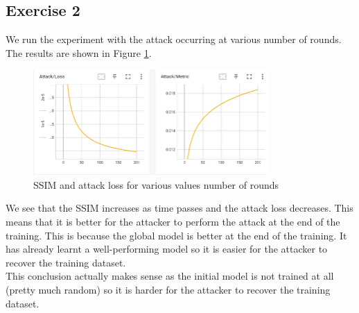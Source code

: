 \documentclass[12pt]{article}
\begin{document}

\subsection{Exercise 2}
We run the experiment with the attack occurring at various number of rounds. The results are shown in Figure \ref{fig:SSIM}.
\begin{figure}[h]
  \centering
  \includegraphics[width=0.8\textwidth]{./images/ssim_200.png}
  \caption{SSIM and attack loss for various values number of rounds}
  \label{fig:SSIM}
\end{figure}
We see that the SSIM increases as time passes and the attack loss decreases. This means that it is better for the attacker to perform the attack at the end of the training. This is because the global model is better at the end of the training. It has already learnt a well-performing model so it is easier for the attacker to recover the training dataset. \\
This conclusion actually makes sense as the initial model is not trained at all (pretty much random) so it is harder for the attacker to recover the training dataset.

\end{document}
